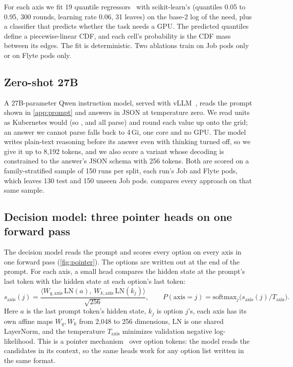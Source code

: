 For each axis we fit 19 quantile regressors~\citep{koenker1978quantile} with scikit-learn's
 (quantiles 0.05 to 0.95, 300 rounds, learning rate 0.06, 31 leaves) on the
base-2 log of the need, plus a classifier that predicts whether the task needs a GPU. The predicted quantiles
define a piecewise-linear CDF, and each cell's probability is the CDF mass between its edges. The fit is
deterministic. Two ablations train on Job pods only or on Flyte pods only.

\subsection{Zero-shot 27B}
A 27B-parameter Qwen instruction model, served with vLLM~\citep{kwon2023vllm}, reads the prompt shown in
\cref{app:prompt} and answers in JSON at temperature zero. We read units as Kubernetes would (so ,
 and  all parse) and round each value up onto the grid; an answer we cannot parse falls back
to 4\,Gi, one core and no GPU. The model writes plain-text reasoning before its answer even with thinking turned
off, so we give it up to 8,192 tokens, and we also score a variant whose decoding is constrained to the answer's
JSON schema with 256 tokens. Both are scored on a family-stratified sample of 150 runs per split, each run's Job
and Flyte pods, which leaves 130 test and 150 unseen Job pods.  compares every approach on that
same sample.

\subsection{Decision model: three pointer heads on one forward pass}
The decision model reads the prompt and scores every option on every axis in one forward pass
(\cref{fig:pointer}). The options are written out at the end of the prompt. For each axis, a small head compares
the hidden state at the prompt's last token with the hidden state at each option's last token:
\begin{equation}
s_{\text{axis}}(j) = \frac{\langle W_{q,\text{axis}}\,\mathrm{LN}(a),\ W_{k,\text{axis}}\,\mathrm{LN}(k_j)\rangle}{\sqrt{256}},\qquad
P(\text{axis}=j) = \mathrm{softmax}_j\!\big(s_{\text{axis}}(j)/T_{\text{axis}}\big).
\end{equation}
Here $a$ is the last prompt token's hidden state, $k_j$ is option $j$'s, each axis has its own affine maps
$W_q, W_k$ from 2,048 to 256 dimensions, $\mathrm{LN}$ is one shared LayerNorm, and the temperature
$T_{\text{axis}}$ minimizes validation negative log-likelihood. This is a pointer
mechanism~\citep{vinyals2015pointer} over option tokens: the model reads the candidates in its context, so the
same heads work for any option list written in the same format.

